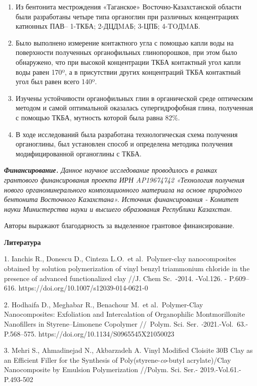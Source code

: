 \begin{enumerate}
\def\labelenumi{\arabic{enumi}.}
\item
  Из бентонита местрождения «Таганское» Восточно-Казахстанской области
  были разработаны четыре типа органоглин при различных концентрациях
  катионных ПАВ-- 1-ТКБА; 2-ДЦДMAБ; 3-ЦПБ; 4-TOДMAБ.
\item
  Было выполнено измерение контактного угла с помощью капли воды на
  поверхности полученных органофильных глинопорошков, при этом было
  обнаружено, что при высокой концентрации ТКБА контактный угол капли
  воды равен 170º, а в присутствии других концентраций ТКБА контактный
  угол был равен всего 140º.
\item
  Изучены устойчивости органофильных глин в органической среде
  оптическим методом и самой оптимальной оказалась супергидрофобная
  глина, полученная с помощью ТКБА, мутность которой была равна 82\%.
\item
  В ходе исследований была разработана технологическая схема получения
  органоглины, был установлен способ и определена методика получения
  модифицированной органоглины с ТКБА.
\end{enumerate}

\emph{\textbf{Финансирование.} Данное научное исследование проводилось в
рамках грантового финансирования проекта ИРН AP19674742 «Технология
получения нового органоминерального композиционного материала на основе
природного бентонита Восточного Казахстана». Источник финансирования -
Комитет науки Министерства науки и высшего образования Республики
Казахстан.}

Авторы выражают благодарность за выделенное грантовое финансирование.

\textbf{Литература}

1. Ianchis R., Donescu D., Cinteza L.O.~et al\emph{.}~Polymer-clay
nanocomposites obtained by solution polymerization of vinyl benzyl
triammonium chloride in the presence of advanced functionalized clay
//J. Chem Sc.~-2014. -Vol.126. - P.609--616.
https://doi.org/10.1007/s12039-014-0621-0

2. Hodhaifa D., Meghabar R., Benachour M.~et al\emph{.}~Polymer-Clay
Nanocomposites: Exfoliation and Intercalation of Organophilic
Montmorillonite Nanofillers in Styrene--Limonene Copolymer //~Polym.
Sci. Ser\emph{. -}2021.-Vol.~63.- P.568--575.
https://doi.org/10.1134/S0965545X21050023

3. Mehri S., Ahmadinejad N., Akbarzadeh A. Vinyl Modified Cloisite 30B
Clay as an Efficient Filler for the Synthesis of
Poly(styrene-\emph{co}-butyl acrylate)/Clay Nanocomposite by Emulsion
Polymerization //Polym. Sci. Ser.- 2019.-Vol.61.-P.493-502

